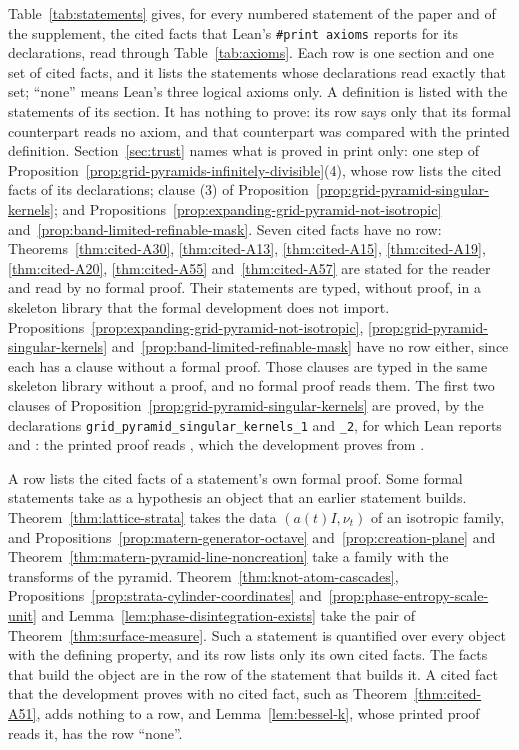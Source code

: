 Table~\ref{tab:statements} gives, for every numbered statement of the paper and of the supplement,
the cited facts that Lean's \texttt{\#print axioms} reports for its declarations, read through
Table~\ref{tab:axioms}. Each row is one section and one set of cited facts, and it lists the
statements whose declarations read exactly that set; ``none'' means Lean's three logical axioms
only. A definition is listed with the statements of its section. It has nothing to prove: its row
says only that its formal counterpart reads no axiom, and that counterpart was compared with the
printed definition. Section~\ref{sec:trust} names what is proved in print only: one step of
Proposition~\ref{prop:grid-pyramids-infinitely-divisible}(4), whose row lists the cited facts of
its declarations; clause (3) of Proposition~\ref{prop:grid-pyramid-singular-kernels}; and
Propositions~\ref{prop:expanding-grid-pyramid-not-isotropic}
and~\ref{prop:band-limited-refinable-mask}. Seven cited facts have no row:
Theorems~\ref{thm:cited-A30}, \ref{thm:cited-A13}, \ref{thm:cited-A15}, \ref{thm:cited-A19},
\ref{thm:cited-A20}, \ref{thm:cited-A55} and~\ref{thm:cited-A57} are stated for the reader and read
by no formal proof. Their statements are typed, without proof, in a skeleton library that the formal
development does not import. Propositions~\ref{prop:expanding-grid-pyramid-not-isotropic},
\ref{prop:grid-pyramid-singular-kernels} and~\ref{prop:band-limited-refinable-mask} have no row
either, since each has a clause without a formal proof. Those clauses are typed in the same skeleton
library without a proof, and no formal proof reads them. The first two clauses of
Proposition~\ref{prop:grid-pyramid-singular-kernels} are proved, by the declarations
\texttt{grid\_pyramid\_singular\_kernels\_1} and \texttt{\_2}, for which Lean reports
 and : the printed proof reads , which the development proves
from .

A row lists the cited facts of a statement's own formal proof. Some formal statements take as a
hypothesis an object that an earlier statement builds. Theorem~\ref{thm:lattice-strata} takes the
data $(a(t)I, \nu_t)$ of an isotropic family, and Propositions~\ref{prop:matern-generator-octave}
and~\ref{prop:creation-plane} and Theorem~\ref{thm:matern-pyramid-line-noncreation} take a family
with the transforms of the \Matern{} pyramid. Theorem~\ref{thm:knot-atom-cascades},
Propositions~\ref{prop:strata-cylinder-coordinates} and~\ref{prop:phase-entropy-scale-unit} and
Lemma~\ref{lem:phase-disintegration-exists} take the pair of Theorem~\ref{thm:surface-measure}.
Such a statement is quantified over every object with the defining property, and its row lists only
its own cited facts. The facts that build the object are in the row of the statement that builds
it. A cited fact that the development proves with no cited fact, such as
Theorem~\ref{thm:cited-A51}, adds nothing to a row, and Lemma~\ref{lem:bessel-k}, whose printed
proof reads it, has the row ``none''.

